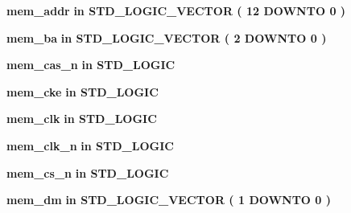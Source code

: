  \begin{DoxyCompactItemize}
\item 
{\bf mem\+\_\+addr}  {\bfseries {\bfseries \textcolor{keywordflow}{in}\textcolor{vhdlchar}{ }}} {\bfseries \textcolor{comment}{S\+T\+D\+\_\+\+L\+O\+G\+I\+C\+\_\+\+V\+E\+C\+T\+OR}\textcolor{vhdlchar}{ }\textcolor{vhdlchar}{(}\textcolor{vhdlchar}{ }\textcolor{vhdlchar}{ } \textcolor{vhdldigit}{12} \textcolor{vhdlchar}{ }\textcolor{keywordflow}{D\+O\+W\+N\+TO}\textcolor{vhdlchar}{ }\textcolor{vhdlchar}{ } \textcolor{vhdldigit}{0} \textcolor{vhdlchar}{ }\textcolor{vhdlchar}{)}\textcolor{vhdlchar}{ }} 
\item 
{\bf mem\+\_\+ba}  {\bfseries {\bfseries \textcolor{keywordflow}{in}\textcolor{vhdlchar}{ }}} {\bfseries \textcolor{comment}{S\+T\+D\+\_\+\+L\+O\+G\+I\+C\+\_\+\+V\+E\+C\+T\+OR}\textcolor{vhdlchar}{ }\textcolor{vhdlchar}{(}\textcolor{vhdlchar}{ }\textcolor{vhdlchar}{ } \textcolor{vhdldigit}{2} \textcolor{vhdlchar}{ }\textcolor{keywordflow}{D\+O\+W\+N\+TO}\textcolor{vhdlchar}{ }\textcolor{vhdlchar}{ } \textcolor{vhdldigit}{0} \textcolor{vhdlchar}{ }\textcolor{vhdlchar}{)}\textcolor{vhdlchar}{ }} 
\item 
{\bf mem\+\_\+cas\+\_\+n}  {\bfseries {\bfseries \textcolor{keywordflow}{in}\textcolor{vhdlchar}{ }}} {\bfseries \textcolor{comment}{S\+T\+D\+\_\+\+L\+O\+G\+IC}\textcolor{vhdlchar}{ }} 
\item 
{\bf mem\+\_\+cke}  {\bfseries {\bfseries \textcolor{keywordflow}{in}\textcolor{vhdlchar}{ }}} {\bfseries \textcolor{comment}{S\+T\+D\+\_\+\+L\+O\+G\+IC}\textcolor{vhdlchar}{ }} 
\item 
{\bf mem\+\_\+clk}  {\bfseries {\bfseries \textcolor{keywordflow}{in}\textcolor{vhdlchar}{ }}} {\bfseries \textcolor{comment}{S\+T\+D\+\_\+\+L\+O\+G\+IC}\textcolor{vhdlchar}{ }} 
\item 
{\bf mem\+\_\+clk\+\_\+n}  {\bfseries {\bfseries \textcolor{keywordflow}{in}\textcolor{vhdlchar}{ }}} {\bfseries \textcolor{comment}{S\+T\+D\+\_\+\+L\+O\+G\+IC}\textcolor{vhdlchar}{ }} 
\item 
{\bf mem\+\_\+cs\+\_\+n}  {\bfseries {\bfseries \textcolor{keywordflow}{in}\textcolor{vhdlchar}{ }}} {\bfseries \textcolor{comment}{S\+T\+D\+\_\+\+L\+O\+G\+IC}\textcolor{vhdlchar}{ }} 
\item 
{\bf mem\+\_\+dm}  {\bfseries {\bfseries \textcolor{keywordflow}{in}\textcolor{vhdlchar}{ }}} {\bfseries \textcolor{comment}{S\+T\+D\+\_\+\+L\+O\+G\+I\+C\+\_\+\+V\+E\+C\+T\+OR}\textcolor{vhdlchar}{ }\textcolor{vhdlchar}{(}\textcolor{vhdlchar}{ }\textcolor{vhdlchar}{ } \textcolor{vhdldigit}{1} \textcolor{vhdlchar}{ }\textcolor{keywordflow}{D\+O\+W\+N\+TO}\textcolor{vhdlchar}{ }\textcolor{vhdlchar}{ } \textcolor{vhdldigit}{0} \textcolor{vhdlchar}{ }\textcolor{vhdlchar}{)}\textcolor{vhdlchar}{ }} 

\end{DoxyCompactItemize}
